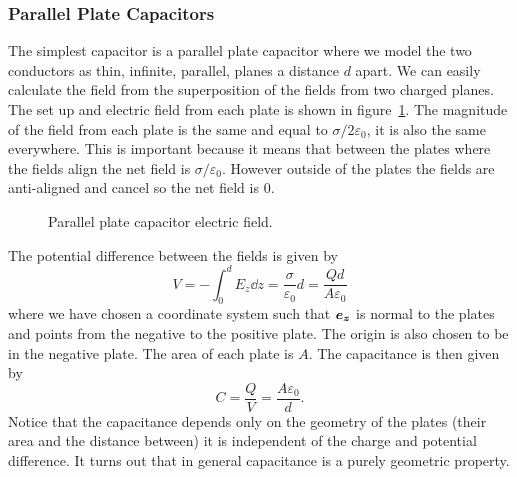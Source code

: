     \subsubsection{Parallel Plate Capacitors}
    The simplest capacitor is a parallel plate capacitor where we model the two conductors as thin, infinite, parallel, planes a distance \(d\) apart.
    We can easily calculate the field from the superposition of the fields from two charged planes.
    The set up and electric field from each plate is shown in figure~\ref{fig:parallel plate capacitor electric field}.
    The magnitude of the field from each plate is the same and equal to \(\sigma/2\varepsilon_0\), it is also the same everywhere.
    This is important because it means that between the plates where the fields align the net field is \(\sigma/\varepsilon_0\).
    However outside of the plates the fields are anti-aligned and cancel so the net field is 0.
    \begin{figure}[ht]
        \centering
        \caption{Parallel plate capacitor electric field.}
        \label{fig:parallel plate capacitor electric field}
    \end{figure}
    The potential difference between the fields is given by
    \[V = -\int_0^d E_z\dd{z} = \frac{\sigma}{\varepsilon_0}d = \frac{Qd}{A\varepsilon_0}\]
    where we have chosen a coordinate system such that \(\bm{e_{z}}\) is normal to the plates and points from the negative to the positive plate.
    The origin is also chosen to be in the negative plate.
    The area of each plate is \(A\).
    The capacitance is then given by
    \[C = \frac{Q}{V} = \frac{A\varepsilon_0}{d}.\]
    Notice that the capacitance depends only on the geometry of the plates (their area and the distance between) it is independent of the charge and potential difference.
    It turns out that in general capacitance is a purely geometric property.
    

